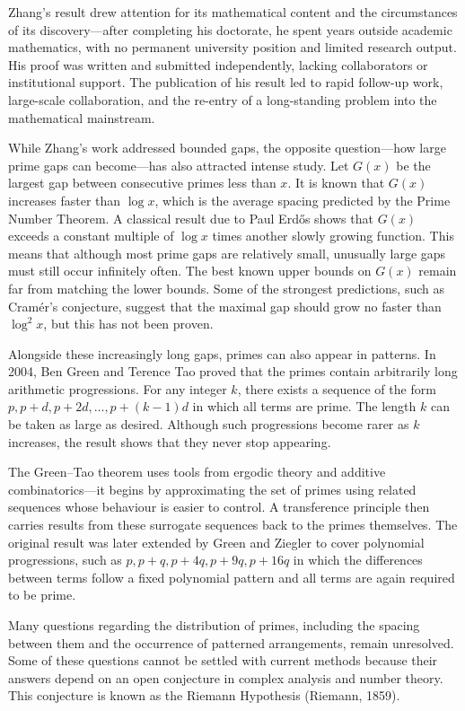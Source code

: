 Zhang's result drew attention for its mathematical content and the circumstances of its discovery—after completing his doctorate, he spent years outside academic mathematics, with no permanent university position and limited research output. His proof was written and submitted independently, lacking collaborators or institutional support. The publication of his result led to rapid follow-up work, large-scale collaboration, and the re-entry of a long-standing problem into the mathematical mainstream.

While Zhang's work addressed bounded gaps, the opposite question—how large prime gaps can become—has also attracted intense study. Let $G(x)$ be the largest gap between consecutive primes less than $x$. It is known that $G(x)$ increases faster than $\log x$, which is the average spacing predicted by the Prime Number Theorem. A classical result due to Paul Erdős shows that $G(x)$ exceeds a constant multiple of $\log x$ times another slowly growing function. This means that although most prime gaps are relatively small, unusually large gaps must still occur infinitely often. The best known upper bounds on $G(x)$ remain far from matching the lower bounds. Some of the strongest predictions, such as Cramér's conjecture, suggest that the maximal gap should grow no faster than $\log^2 x$, but this has not been proven.

Alongside these increasingly long gaps, primes can also appear in patterns. In 2004, Ben Green and Terence Tao proved that the primes contain arbitrarily long arithmetic progressions. For any integer $k$, there exists a sequence of the form $p,  p + d,  p + 2d,  \dots,  p + (k - 1)d$ in which all terms are prime. The length $k$ can be taken as large as desired. Although such progressions become rarer as $k$ increases, the result shows that they never stop appearing.

The Green–Tao theorem uses tools from ergodic theory and additive combinatorics—it begins by approximating the set of primes using related sequences whose behaviour is easier to control. A transference principle then carries results from these surrogate sequences back to the primes themselves. The original result was later extended by Green and Ziegler to cover polynomial progressions, such as $p,  p + q,  p + 4q,  p + 9q,  p + 16q$ in which the differences between terms follow a fixed polynomial pattern and all terms are again required to be prime.

Many questions regarding the distribution of primes, including the spacing between them and the occurrence of patterned arrangements, remain unresolved. Some of these questions cannot be settled with current methods because their answers depend on an open conjecture in complex analysis and number theory. This conjecture is known as the Riemann Hypothesis (Riemann, 1859).

